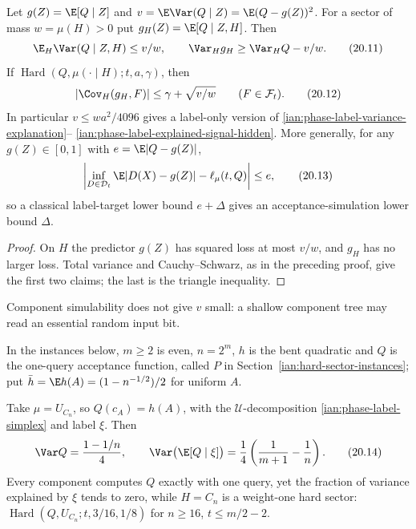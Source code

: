 \begin{proposition}
\label{ian:phase-label-flat-components}
Let \(g(Z)=\E[Q\mid Z]\) and \(v=\E\Var(Q\mid Z)=\E(Q-g(Z))^2\). For a
sector of mass \(w=\mu(H)>0\) put \(g_H(Z)=\E[Q\mid Z,H]\). Then
\[
 \E_H\Var(Q\mid Z,H)\le v/w,
 \qquad
 \Var_Hg_H\ge\Var_HQ-v/w.
 \tag{20.11}\label{ian:phase-label-flat-variance}
\]
If \(\operatorname{Hard}(Q,\mu(\cdot\mid H);t,a,\gamma)\), then
\[
 |\Cov_H(g_H,F)|\le\gamma+\sqrt{v/w}
 \qquad(F\in\mathcal F_t).
 \tag{20.12}\label{ian:phase-label-flat-covariance}
\]
In particular \(v\le wa^2/4096\) gives a label-only version of
\eqref{ian:phase-label-variance-explanation}--%
\eqref{ian:phase-label-explained-signal-hidden}. More generally, for any
\(g(Z)\in[0,1]\) with \(e=\E|Q-g(Z)|\),
\[
 \left|
 \inf_{D\in\mathcal D_t}\E|D(X)-g(Z)|
 -\ell_\mu(t,Q)
 \right|\le e,
 \tag{20.13}\label{ian:phase-label-pure-target-comparison}
\]
so a classical label-target lower bound \(e+\Delta\) gives an
acceptance-simulation lower bound \(\Delta\).
\end{proposition}

\begin{proof}
On \(H\) the predictor \(g(Z)\) has squared loss at most \(v/w\), and
\(g_H\) has no larger loss. Total variance and Cauchy--Schwarz, as in the
preceding proof, give the first two claims; the last is the triangle
inequality.
\end{proof}

Component simulability does not give \(v\) small: a shallow component
tree may read an essential random input bit.

In the instances below, \(m\ge2\) is even, \(n=2^m\), \(h\) is the bent
quadratic and \(Q\) is the one-query acceptance function, called \(P\)
in Section~\ref{ian:hard-sector-instances}; put
\(\bar h=\E h(A)=(1-n^{-1/2})/2\) for uniform \(A\).

\begin{proposition}
\label{ian:phase-label-simplex-counterexample}
Take \(\mu=U_{C_n}\), so \(Q(c_A)=h(A)\), with the
\(\mathcal U\)-decomposition \eqref{ian:phase-label-simplex} and label
\(\xi\). Then
\[
 \Var Q=\frac{1-1/n}{4},
 \qquad
 \Var\bigl(\E[Q\mid\xi]\bigr)
 =\frac14\left(\frac1{m+1}-\frac1n\right).
 \tag{20.14}\label{ian:phase-label-small-between}
\]
Every component computes \(Q\) exactly with one query, yet the fraction
of variance explained by \(\xi\) tends to zero, while \(H=C_n\) is a
weight-one hard sector: \(\operatorname{Hard}(Q,U_{C_n};t,3/16,1/8)\) for
\(n\ge16\), \(t\le m/2-2\).
\end{proposition}

